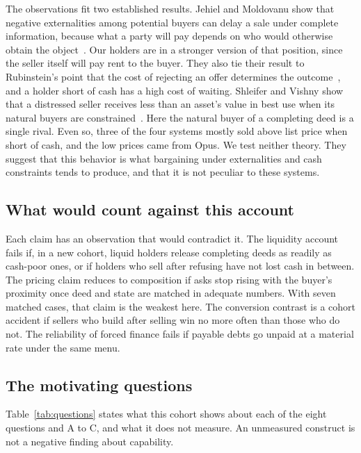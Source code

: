 The observations fit two established results. Jehiel and Moldovanu show that negative externalities among potential buyers can delay a sale under complete information, because what a party will pay depends on who would otherwise obtain the object~\cite{jehiel1995delay}. Our holders are in a stronger version of that position, since the seller itself will pay rent to the buyer. They also tie their result to Rubinstein's point that the cost of rejecting an offer determines the outcome~\cite{rubinstein1982perfect}, and a holder short of cash has a high cost of waiting. Shleifer and Vishny show that a distressed seller receives less than an asset's value in best use when its natural buyers are constrained~\cite{shleifer1992liquidation,shleifer2011firesales}. Here the natural buyer of a completing deed is a single rival. Even so, three of the four systems mostly sold above list price when short of cash, and the low prices came from Opus. We test neither theory. They suggest that this behavior is what bargaining under externalities and cash constraints tends to produce, and that it is not peculiar to these systems.

\subsection{What would count against this account}

Each claim has an observation that would contradict it. The liquidity account fails if, in a new cohort, liquid holders release completing deeds as readily as cash-poor ones, or if holders who sell after refusing have not lost cash in between. The pricing claim reduces to composition if asks stop rising with the buyer's proximity once deed and state are matched in adequate numbers. With seven matched cases, that claim is the weakest here. The conversion contrast is a cohort accident if sellers who build after selling win no more often than those who do not. The reliability of forced finance fails if payable debts go unpaid at a material rate under the same menu.

\subsection{The motivating questions}

Table~\ref{tab:questions} states what this cohort shows about each of the eight questions and A to C, and what it does not measure. An unmeasured construct is not a negative finding about capability.


